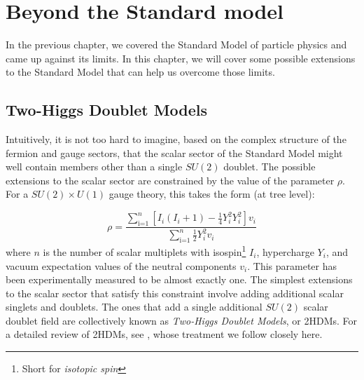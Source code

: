 \chapter{Beyond the Standard model}\label{ch:bsm}

In the previous chapter, we covered the Standard Model of particle physics and came up against its limits. In this chapter, we will cover some possible extensions to the Standard Model that can help us overcome those limits.

\section{Two-Higgs Doublet Models}

Intuitively, it is not too hard to imagine, based on the complex structure of the fermion and gauge sectors, that the scalar sector of the Standard Model might well contain members other than a single $SU(2)$ doublet. The possible extensions to the scalar sector are constrained by the value of the parameter $\rho$. For a $SU(2)\times U(1)$ gauge theory, this takes the form (at tree level):

\begin{equation}
\rho = \frac{\sum_\text{i=1}^n\left[I_i(I_i+1)-\frac{1}{4}Y_i^2Y_i^2\right]v_i}{\sum_\text{i=1}^n\frac{1}{2}Y_i^2v_i}
\end{equation}
%
where $n$ is the number of scalar multiplets with isospin\footnote{Short for \emph{isotopic spin}} $I_i$, hypercharge $Y_i$, and vacuum expectation values of the neutral components $v_i$. This parameter has been experimentally measured to be almost exactly one. The simplest extensions to the scalar sector that satisfy this constraint involve adding additional scalar singlets and doublets. The ones that add a single additional $SU(2)$ scalar doublet field are collectively known as \emph{Two-Higgs Doublet Models}, or 2HDMs. For a detailed review of 2HDMs, see \citep{Branco2012}, whose treatment we follow closely here.


